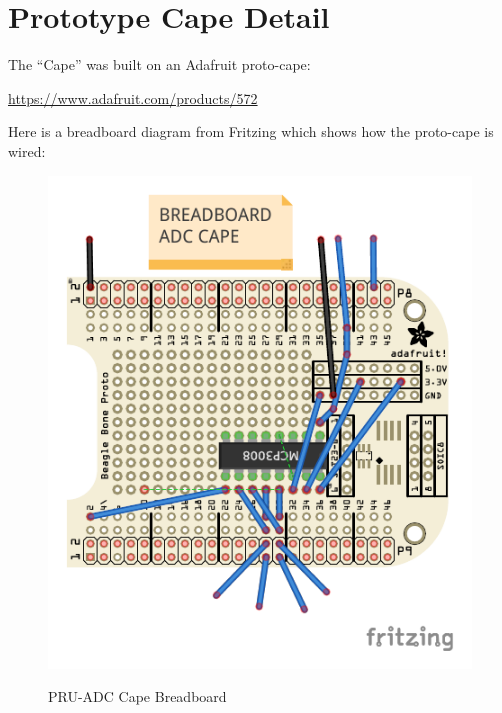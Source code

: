 %
%
%

\chapter{Prototype Cape Detail}


The ``Cape'' was built on an Adafruit proto-cape:

\url{https://www.adafruit.com/products/572}

Here is a breadboard diagram from Fritzing which shows how the proto-cape
is wired:

\begin{figure}[h]
	\centering
	\includegraphics[]{../../pcb/adafruit_proto_cape_bb}
	\centering\bfseries
	\caption{PRU-ADC Cape Breadboard}
\end{figure}

